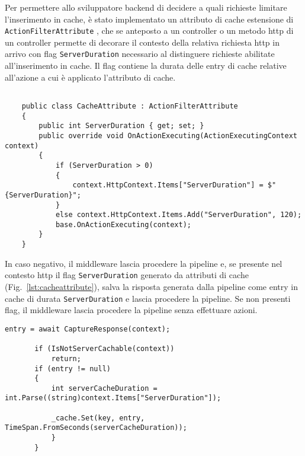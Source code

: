 Per permettere allo sviluppatore backend di decidere a quali richieste limitare l'inserimento in cache, è stato implementato un attributo di cache estensione di \\ \verb|ActionFilterAttribute| \cite{ACTIONFILTER}, che se anteposto a un controller o un metodo http di un controller permette di decorare il contesto della relativa richiesta http \cite{HTTPCONTEXT} in arrivo con flag \verb|ServerDuration| necessario al distinguere richieste abilitate all'inserimento in cache.
Il flag contiene la durata delle entry di cache relative all'azione a cui è applicato l'attributo di cache.

\begin{lstlisting}[caption={CacheAttribute.cs}, style=javaScriptCode, label={lst:cacheattribute}]

    public class CacheAttribute : ActionFilterAttribute
    {
        public int ServerDuration { get; set; }
        public override void OnActionExecuting(ActionExecutingContext context)
        {
            if (ServerDuration > 0)
            {
                context.HttpContext.Items["ServerDuration"] = $"{ServerDuration}";
            }
            else context.HttpContext.Items.Add("ServerDuration", 120);
            base.OnActionExecuting(context);
        }
    }
\end{lstlisting}

In caso negativo, il middleware lascia procedere la pipeline e, se presente nel contesto http \cite{HTTPCONTEXT} il flag \verb|ServerDuration| generato da attributi di cache \cite{ACTIONFILTER} (Fig.~\ref{lst:cacheattribute}), salva la risposta generata dalla pipeline come entry in cache di durata \verb|ServerDuration| e lascia procedere la pipeline. Se non presenti flag, il middleware lascia procedere la pipeline senza effettuare azioni.





\begin{lstlisting}[caption={TotallyOriginalCachingMiddleware.cs, Cache miss scenario}, style=javaScriptCode]
entry = await CaptureResponse(context);

       if (IsNotServerCachable(context))
           return;
       if (entry != null)
       {
           int serverCacheDuration = int.Parse((string)context.Items["ServerDuration"]);

           _cache.Set(key, entry, TimeSpan.FromSeconds(serverCacheDuration));
           }
       }
\end{lstlisting}

